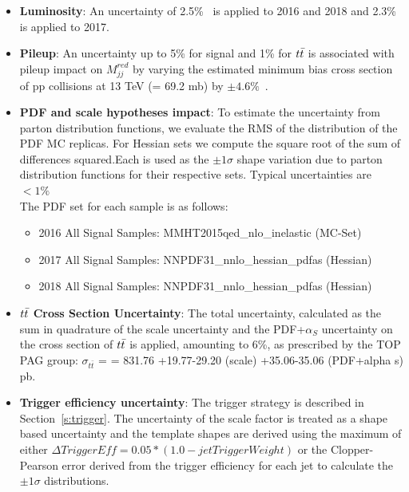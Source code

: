 \begin{itemize}

\item \textbf{Luminosity}: An uncertainty of 2.5\%~\cite{CMS-PAS-LUM-17-001} is applied to 2016 and 2018 and 2.3\% is applied to 2017.

\item \textbf{Pileup}: An uncertainty up to 5\% for signal and 1\% for $t\bar{t} $ is associated with pileup impact on $M_{jj}^{red}$ by varying the estimated minimum bias cross section of pp collisions at 13 TeV (= 69.2 mb) by $\pm 4.6\%$~\cite{PileupTWiki}.

\item \textbf{PDF and scale hypotheses impact}: To estimate the uncertainty from parton distribution functions, we evaluate the RMS of the distribution of the PDF MC replicas. For Hessian sets we compute the square root of the sum of differences squared.Each is used as the $\pm 1 \sigma$ shape variation due to parton distribution functions for their respective sets. Typical uncertainties are $ < 1\% $\\
The PDF set for each sample is as follows:
\begin{itemize}
\item 2016 All Signal Samples: MMHT2015qed\_nlo\_inelastic (MC-Set)
\item 2017 All Signal Samples: NNPDF31\_nnlo\_hessian\_pdfas (Hessian)
\item 2018 All Signal Samples: NNPDF31\_nnlo\_hessian\_pdfas (Hessian)
\end{itemize}


\item \textbf{$t\bar{t} $ Cross Section Uncertainty}: The total uncertainty, calculated as the sum in quadrature of the scale uncertainty and the PDF+$\alpha_S$ uncertainty on the cross section of $t\bar{t} $ is applied, amounting to 6\%, as prescribed by the TOP PAG group: $\sigma_{t \bar t}$ = = 831.76 +19.77-29.20 (scale) +35.06-35.06 (PDF+alpha s) pb. 

\item \textbf{Trigger efficiency uncertainty}: The trigger strategy is described in Section~\ref{s:trigger}. The uncertainty of the scale factor is treated as a shape based uncertainty and the template shapes are derived using the maximum of either $\Delta TriggerEff  = 0.05*(1.0-jetTriggerWeight)$ or the Clopper-Pearson error derived from the trigger efficiency for each jet to calculate the $\pm 1 \sigma$ distributions.
  

\end{itemize}
